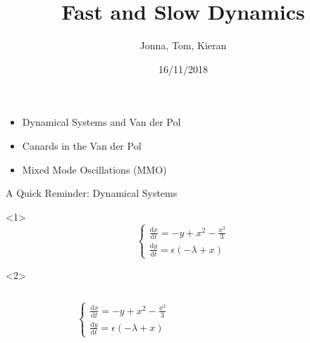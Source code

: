 \documentclass[11pt]{beamer}
\newcommand{\dif}{\mathrm{d}}
\newcommand{\vdp}{Van der Pol }
\begin{document}
  

\author{Jonna, Tom, Kieran}
\title{Fast and Slow Dynamics}
\date{16/11/2018} 
\frame \titlepage
\begin{frame}
\begin{itemize}
\item Dynamical Systems and \vdp
\item Canards in the \vdp 
\item Mixed Mode Oscillations (MMO) 
\end{itemize}

\end{frame}


\begin{frame}{ A Quick Reminder: Dynamical Systems}
\begin{onlyenv}<1>
\huge
 \[\begin{cases}
 \frac{\dif x}{\dif t}= -y + x^2 - \frac{x^3}{3}\\
 \frac{\dif y}{\dif t}=\epsilon (-\lambda+x)
 \end{cases}\]%
\end{onlyenv}
\begin{onlyenv}<2>
\begin{columns}
\begin{figure}
    \centering
{}
\end{figure}
\[\begin{cases}
 \frac{\dif x}{\dif t}= -y + x^2 - \frac{x^3}{3}\\
 \frac{\dif y}{\dif t}=\epsilon (-\lambda+x)
 \end{cases}\]
\end{columns}
\end{onlyenv}
\end{frame} 
\end{document}
